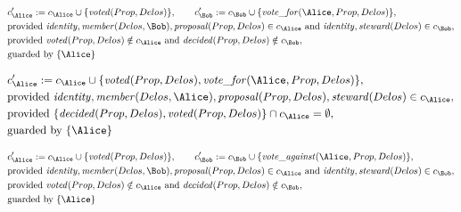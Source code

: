 \begin{align*}
&
c'_
{
\Alice
}
 := 
c_
{
\Alice
}
 \cup 
\{
\mathit{\detokenize{
voted
}}
(
Prop
,
Delos
)
\}
, \qquad 
c'_
{
\Bob
}
 := 
c_
{
\Bob
}
 \cup 
\{
\mathit{\detokenize{
vote_for
}}
(
\Alice
,
Prop
,
Delos
)
\}
,\\
&
\text{provided } 
\mathit{\detokenize{
identity
}}
,
\mathit{\detokenize{
member
}}
(
Delos
,
\Bob
)
,
\mathit{\detokenize{
proposal
}}
(
Prop
,
Delos
)
 \in c_
{
\Alice
}
 \text{ and } 
\mathit{\detokenize{
identity
}}
,
\mathit{\detokenize{
steward
}}
(
Delos
)
 \in c_
{
\Bob
}
,\\
&
\text{provided } 
\mathit{\detokenize{
voted
}}
(
Prop
,
Delos
)
 \notin c_
{
\Alice
}
 \text{ and } 
\mathit{\detokenize{
decided
}}
(
Prop
,
Delos
)
 \notin c_
{
\Bob
}
,\\
&
\text{guarded by } \{
\Alice
\}
\end{align*}

\begin{align*}
&
c'_
{
\Alice
}
 := 
c_
{
\Alice
}
 \cup 
\{
\mathit{\detokenize{
voted
}}
(
Prop
,
Delos
)
,
\mathit{\detokenize{
vote_for
}}
(
\Alice
,
Prop
,
Delos
)
\}
,\\
&
\text{provided } 
\mathit{\detokenize{
identity
}}
,
\mathit{\detokenize{
member
}}
(
Delos
,
\Alice
)
,
\mathit{\detokenize{
proposal
}}
(
Prop
,
Delos
)
,
\mathit{\detokenize{
steward
}}
(
Delos
)
 \in c_
{
\Alice
}
,\\
&
\text{provided } 
\{
\mathit{\detokenize{
decided
}}
(
Prop
,
Delos
)
,
\mathit{\detokenize{
voted
}}
(
Prop
,
Delos
)
\}
 \cap c_
{
\Alice
}
 = \emptyset
,\\
&
\text{guarded by } \{
\Alice
\}
\end{align*}

\begin{align*}
&
c'_
{
\Alice
}
 := 
c_
{
\Alice
}
 \cup 
\{
\mathit{\detokenize{
voted
}}
(
Prop
,
Delos
)
\}
, \qquad 
c'_
{
\Bob
}
 := 
c_
{
\Bob
}
 \cup 
\{
\mathit{\detokenize{
vote_against
}}
(
\Alice
,
Prop
,
Delos
)
\}
,\\
&
\text{provided } 
\mathit{\detokenize{
identity
}}
,
\mathit{\detokenize{
member
}}
(
Delos
,
\Bob
)
,
\mathit{\detokenize{
proposal
}}
(
Prop
,
Delos
)
 \in c_
{
\Alice
}
 \text{ and } 
\mathit{\detokenize{
identity
}}
,
\mathit{\detokenize{
steward
}}
(
Delos
)
 \in c_
{
\Bob
}
,\\
&
\text{provided } 
\mathit{\detokenize{
voted
}}
(
Prop
,
Delos
)
 \notin c_
{
\Alice
}
 \text{ and } 
\mathit{\detokenize{
decided
}}
(
Prop
,
Delos
)
 \notin c_
{
\Bob
}
,\\
&
\text{guarded by } \{
\Alice
\}
\end{align*}
